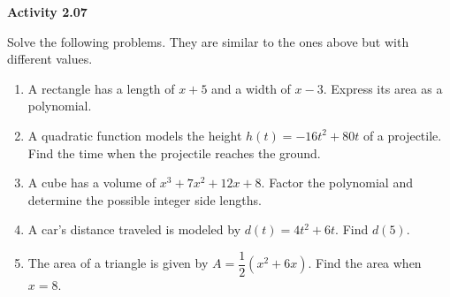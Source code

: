\vspace{0.3ex}
\noindent\textbf{Activity 2.07}

\vspace{0.2ex}

Solve the following problems. They are similar to the ones above but with different values.

\begin{enumerate}
    \item A rectangle has a length of $x+5$ and a width of $x-3$. Express its area as a polynomial.
    \item A quadratic function models the height $h(t) = -16t^2 + 80t$ of a projectile. Find the time when the projectile reaches the ground.
    \item A cube has a volume of $x^3 + 7x^2 + 12x + 8$. Factor the polynomial and determine the possible integer side lengths.
    \item A car’s distance traveled is modeled by $d(t) = 4t^2 + 6t$. Find $d(5)$.
    \item The area of a triangle is given by $A = \dfrac{1}{2} (x^2 + 6x)$. Find the area when $x = 8$.
\end{enumerate}
